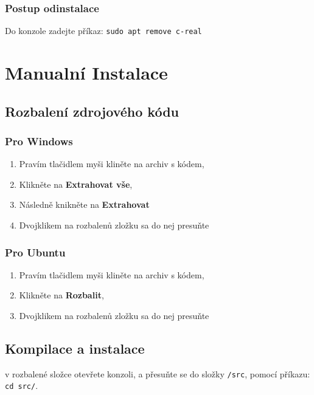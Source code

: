 \documentclass[12pt]{article}
\begin{document}
\subsubsection{Postup odinstalace}
Do konzole zadejte příkaz: \verb|sudo apt remove c-real|

\clearpage
\newpage

\section{Manualní Instalace}

\subsection{Rozbalení zdrojového kódu}

\subsubsection{Pro Windows}

\begin{enumerate}
    \item Pravím tlačidlem myši kliněte na archiv s kódem,
    \item Klikněte na \textbf{Extrahovat vše},
    \item Následně knikněte na \textbf{Extrahovat}
    \item Dvojklikem na rozbalenů zložku sa do nej presuňte
\end{enumerate}

\subsubsection{Pro Ubuntu}

\begin{enumerate}
    \item Pravím tlačidlem myši kliněte na archiv s kódem,
    \item Klikněte na \textbf{Rozbalit},
    \item Dvojklikem na rozbalenů zložku sa do nej presuňte
\end{enumerate}

\subsection{Kompilace a instalace}
     v rozbalené složce otevřete konzoli, a přesuňte se do složky \verb|/src|, pomocí příkazu: \verb|cd src/|.
\end{document}
